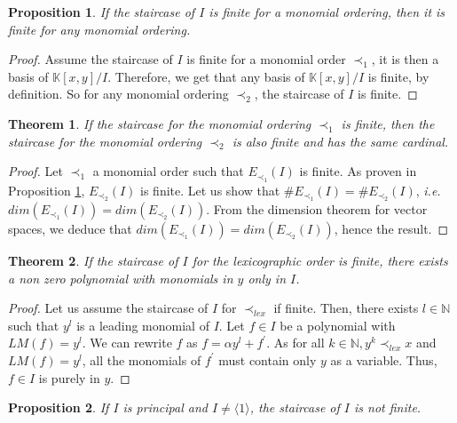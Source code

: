 \documentclass{article}
\newtheorem{theorem}{Theorem}[section]
\newtheorem{proposition}{Proposition}[section]
\begin{document}
\begin{proposition} \label{proposition:staircase-finite-any-order}
    If the staircase of $I$ is finite for a monomial ordering, then it is finite for any monomial ordering.
\end{proposition}

\begin{proof} 
    Assume the staircase of $I$ is finite for a monomial order $\prec_{1}$, it is then a basis of $\mathbb{K}[x, y] / I$. Therefore, we get that any basis of $\mathbb{K}[x, y] / I$ is finite, by definition. So for any monomial ordering $\prec_{2}$, the staircase of $I$ is finite.  
\end{proof}

\begin{theorem}
    If the staircase for the monomial ordering $\prec_{1}$ is finite, then the staircase for the monomial ordering $\prec_{2}$ is also finite and has the same cardinal.
\end{theorem}

\begin{proof}
    Let $\prec_{1}$ a monomial order such that $E_{\prec_{1}}(I)$ is finite. As proven in Proposition \ref{proposition:staircase-finite-any-order}, $E_{\prec_{2}}(I)$ is finite. Let us show that $\# E_{\prec_{1}}(I) = \# E_{\prec_{2}}(I)$, \textit{i.e.} $dim(E_{\prec_{1}}(I)) = dim(E_{\prec_{2}}(I))$. From the dimension theorem for vector spaces, we deduce that $dim(E_{\prec_{1}}(I)) = dim(E_{\prec_{2}}(I))$, hence the result.
\end{proof}

\begin{theorem} \label{th:polynomial-only-in-y}
    If the staircase of $I$ for the lexicographic order is finite, there exists a non zero polynomial with monomials in $y$ only in $I$.
\end{theorem}

\begin{proof}
    Let us assume the staircase of $I$ for $\prec_{lex}$ if finite. Then, there exists $l \in \mathbb{N}$ such that $y^{l}$ is a leading monomial of $I$. Let $f \in I$ be a polynomial with $LM(f) = y^{l}$. We can rewrite $f$ as $f = \alpha y^{l} + f^{\prime}$. As for all $k \in \mathbb{N}, y^{k} \prec_{lex} x$ and $LM(f) = y^{l}$, all the monomials of $f^{\prime}$ must contain only $y$ as a variable. Thus,  $f \in I$ is purely in $y$.
\end{proof}

\begin{proposition}
    If $I$ is principal and $I \neq \langle 1 \rangle$, the staircase of $I$ is not finite. 
\end{proposition}
\end{document}
